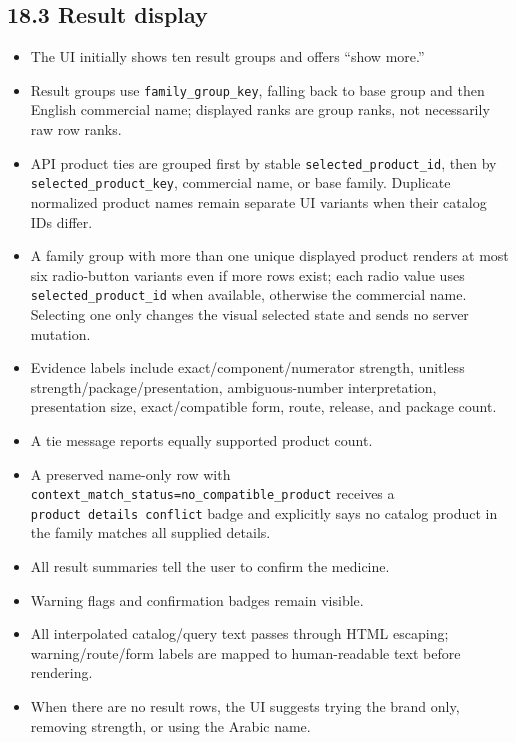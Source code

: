 \subsection{18.3 Result display}\label{183-result-display}

\begin{itemize}
\tightlist
\item
  The UI initially shows ten result groups and offers ``show more.''
\item
  Result groups use \texttt{family\_\allowbreak{}group\_\allowbreak{}key}, falling back to base group and then English commercial name; displayed ranks are group ranks, not necessarily raw row ranks.
\item
  API product ties are grouped first by stable \texttt{selected\_\allowbreak{}product\_\allowbreak{}id}, then by \texttt{selected\_\allowbreak{}product\_\allowbreak{}key}, commercial name, or base family. Duplicate normalized product names remain separate UI variants when their catalog IDs differ.
\item
  A family group with more than one unique displayed product renders at most six radio-button variants even if more rows exist; each radio value uses \texttt{selected\_\allowbreak{}product\_\allowbreak{}id} when available, otherwise the commercial name. Selecting one only changes the visual selected state and sends no server mutation.
\item
  Evidence labels include exact/component/numerator strength, unitless strength/package/presentation, ambiguous-number interpretation, presentation size, exact/compatible form, route, release, and package count.
\item
  A tie message reports equally supported product count.
\item
  A preserved name-only row with \texttt{context\_\allowbreak{}match\_\allowbreak{}status=no\_\allowbreak{}compatible\_\allowbreak{}product} receives a \texttt{product\ details\ conflict} badge and explicitly says no catalog product in the family matches all supplied details.
\item
  All result summaries tell the user to confirm the medicine.
\item
  Warning flags and confirmation badges remain visible.
\item
  All interpolated catalog/query text passes through HTML escaping; warning/route/form labels are mapped to human-readable text before rendering.
\item
  When there are no result rows, the UI suggests trying the brand only, removing strength, or using the Arabic name.
\end{itemize}

